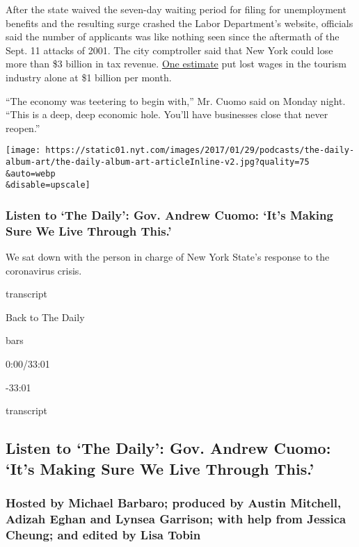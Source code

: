 After the state waived the seven-day waiting period for filing for
unemployment benefits and the resulting surge crashed the Labor
Department's website, officials said the number of applicants was like
nothing seen since the aftermath of the Sept. 11 attacks of 2001. The
city comptroller said that New York could lose more than \$3 billion in
tax revenue.
\href{https://www.nytimes.com/2020/03/16/nyregion/Coronavirus-nyc-economy-.html}{One
estimate} put lost wages in the tourism industry alone at \$1 billion
per month.

``The economy was teetering to begin with,'' Mr. Cuomo said on Monday
night. ``This is a deep, deep economic hole. You'll have businesses
close that never reopen.''

\texttt{[image: https://static01.nyt.com/images/2017/01/29/podcasts/the-daily-album-art/the-daily-album-art-articleInline-v2.jpg?quality=75\\\&auto=webp\\\&disable=upscale]}

\hypertarget{listen-to-the-daily-gov-andrew-cuomo-its-making-sure-we-live-through-this}{%
\subsubsection{Listen to `The Daily': Gov. Andrew Cuomo: `It's Making
Sure We Live Through
This.'}\label{listen-to-the-daily-gov-andrew-cuomo-its-making-sure-we-live-through-this}}

We sat down with the person in charge of New York State's response to
the coronavirus crisis.

transcript

Back to The Daily

bars

0:00/33:01

-33:01

transcript

\hypertarget{listen-to-the-daily-gov-andrew-cuomo-its-making-sure-we-live-through-this-1}{%
\subsection{Listen to `The Daily': Gov. Andrew Cuomo: `It's Making Sure
We Live Through
This.'}\label{listen-to-the-daily-gov-andrew-cuomo-its-making-sure-we-live-through-this-1}}

\hypertarget{hosted-by-michael-barbaro-produced-by-austin-mitchell-adizah-eghan-and-lynsea-garrison-with-help-from-jessica-cheung-and-edited-by-lisa-tobin}{%
\subsubsection{Hosted by Michael Barbaro; produced by Austin Mitchell,
Adizah Eghan and Lynsea Garrison; with help from Jessica Cheung; and
edited by Lisa
Tobin}\label{hosted-by-michael-barbaro-produced-by-austin-mitchell-adizah-eghan-and-lynsea-garrison-with-help-from-jessica-cheung-and-edited-by-lisa-tobin}}

